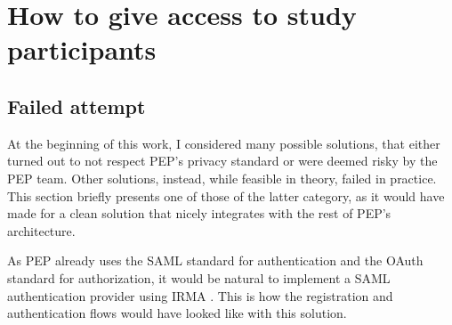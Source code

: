 \documentclass{report}
\begin{document}
\section{How to give access to study participants}
\subsection{Failed attempt}
At the beginning of this work, I considered many possible solutions, that either turned out to not respect PEP's privacy standard or were deemed risky by the PEP team. Other
solutions, instead, while feasible in theory, failed in practice. This section briefly presents one of those of the latter category, as it would have made for a clean solution that
nicely integrates with the rest of PEP's architecture. \par
As PEP already uses the SAML standard \cite{sstc-saml-core-errata-2.0-wd-07} for authentication and the OAuth standard \cite{OAuth} for authorization, it would be natural to implement a 
SAML authentication provider using IRMA \cite{irma-app}.
This is how the registration and authentication flows would have looked like with this solution. 
\begin{figure}[p]
	
	\centering
\end{figure}
\end{document}
